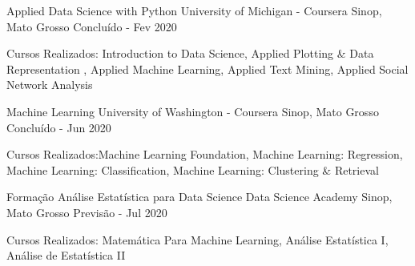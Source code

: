\documentclass[11pt, letter]{awesome-cv}
\begin{document}
\vspace{-3mm}
\vspace{-2mm}
\begin{cventries}

	\cventry
	{Applied Data Science with Python}
	{\vspace{3mm}University of Michigan - Coursera\vspace{-5mm}}
	{\vspace{3mm}Sinop, Mato Grosso\vspace{-5mm}}
	{Concluído - Fev 2020}
	{
		\begin{cvitems}
			\vspace{-1mm}
			\item {Cursos Realizados: Introduction to Data Science, Applied Plotting \& Data Representation , Applied Machine Learning, Applied Text Mining, Applied Social Network Analysis\vspace{-2mm}}
		\end{cvitems}
	}
	\cventry
	{Machine Learning}
	{\vspace{3mm}University of Washington - Coursera\vspace{-5mm}}
	{\vspace{3mm}Sinop, Mato Grosso\vspace{-5mm}}
	{Concluído - Jun 2020}
	{
		\begin{cvitems}
			\vspace{-1mm}
			\item {Cursos Realizados:Machine Learning Foundation, Machine Learning: Regression, Machine Learning: Classification, Machine Learning: Clustering \& Retrieval\vspace{-2mm}}
		\end{cvitems}
	}
	\cventry
	{Formação Análise Estatística para Data Science}
	{\vspace{3mm}Data Science Academy\vspace{-5mm}}
	{\vspace{3mm}Sinop, Mato Grosso\vspace{-5mm}}
	{Previsão - Jul 2020}
	{
		\begin{cvitems}
			\vspace{-2mm}
			\item {Cursos Realizados: Matemática Para Machine Learning, Análise Estatística I, Análise de Estatística II\vspace{-2mm}}
		\end{cvitems}
	}
\end{cventries}
\end{document}
